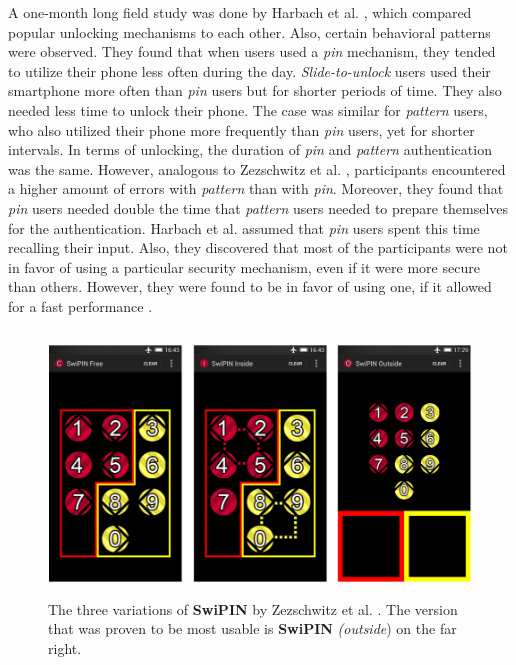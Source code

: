 A one-month long field study was done by Harbach et al. \cite{AnatomySmartphone}, which compared popular unlocking mechanisms to each other. Also, certain behavioral patterns were observed. They found that when users used a \textit{pin} mechanism, they tended to utilize their phone less often during the day. \textit{Slide-to-unlock} users used their smartphone more often than \textit{pin} users but for shorter periods of time. They also needed less time to unlock their phone. The case was similar for \textit{pattern} users, who also utilized their phone more frequently than \textit{pin} users, yet for shorter intervals. In terms of unlocking, the duration of \textit{pin} and \textit{pattern} authentication was the same. However, analogous to Zezschwitz et al. \cite{PatternWild}, participants encountered a higher amount of errors with \textit{pattern} than with \textit{pin}.
Moreover, they found that \textit{pin} users needed double the time that \textit{pattern} users needed to prepare themselves for the authentication. Harbach et al. \cite{AnatomySmartphone} assumed that \textit{pin} users spent this time recalling their input. Also, they discovered that most of the participants were not in favor of using a particular security mechanism, even if it were more secure than others. However, they were found to be in favor of using one, if it allowed for a fast performance  \cite{AnatomySmartphone,Albayram:2017:BUL:3235924.3235929}.

\begin{figure}[t!]
\centering
\includegraphics[width=13cm, height=7cm]{Chapters/graphics/swipin.PNG}
\caption{The three variations of \textbf{SwiPIN} by Zezschwitz et al. \cite{Swipin}. The version that was proven to be most usable is \textbf{SwiPIN} \textit{(outside}) on the far right. }
\label{fig:swipin}
\end{figure}


